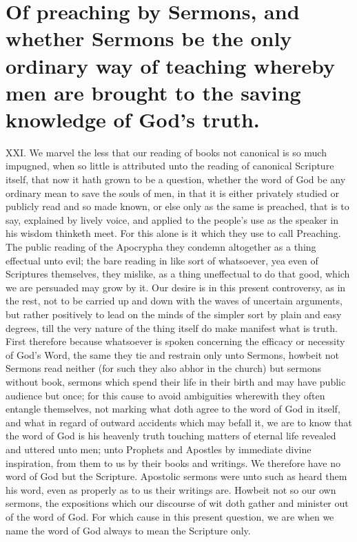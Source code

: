 \section*{Of preaching by Sermons, and whether Sermons be the only ordinary way of teaching whereby men are brought to the saving knowledge of God’s truth.}
XXI. We marvel the less that our reading of books not canonical is so much impugned, when so little is attributed unto the reading of canonical Scripture itself, that now it hath grown to be a question, whether the word of God be any ordinary mean to save the souls of men, in that it is either privately studied or publicly read and so made known, or else only as the same is preached, that is to say, explained by lively voice, and applied to the people’s use as the speaker in his wisdom thinketh meet. For this alone is it which they use to call Preaching. The public reading of the Apocrypha they condemn altogether as a thing effectual unto evil; the bare reading in like sort of whatsoever, yea even of Scriptures themselves, they mislike, as a thing uneffectual to do that good, which we are persuaded may grow by it.
Our desire is in this present controversy, as in the rest, not to be carried up and down with the waves of uncertain arguments, but rather positively to lead on the minds of the simpler sort by plain and easy degrees, till the very nature of the thing itself do make manifest what is truth. First therefore because whatsoever is spoken concerning the efficacy or necessity of God’s Word, the same they tie and restrain only unto Sermons, howbeit not Sermons read neither (for such they also abhor in the church) but sermons without book, sermons which spend their life in their birth and may have public audience but once; for this cause to avoid ambiguities wherewith they often entangle themselves, not marking what doth agree to the word of God in itself, and what in regard of  outward accidents which may befall it, we are to know that the word of God is his heavenly truth touching matters of eternal life revealed and uttered unto men; unto Prophets and Apostles by immediate divine inspiration, from them to us by their books and writings. We therefore have no word of God but the Scripture. Apostolic sermons were unto such as heard them his word, even as properly as to us their writings are. Howbeit not so our own sermons, the expositions which our discourse of wit doth gather and minister out of the word of God. For which cause in this present question, we are when we name the word of God always to mean the Scripture only.
